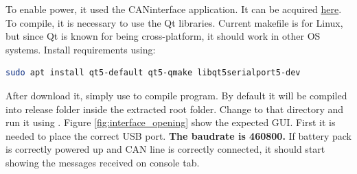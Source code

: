To enable power, it used the CANinterface application. It can be acquired \href{https://drive.google.com/drive/folders/14vwq4Xsy3RlByVp1BpFwrFQleFbBh3zu?usp=sharing}{here}. To compile, it is necessary to use the Qt libraries. Current makefile is for Linux, but since Qt is known for being cross-platform, it should work in other OS systems. Install requirements using: 

\begin{lstlisting}[frame=none,language=bash,backgroundcolor=\color{gray!15},numbers=none, basicstyle=\ttfamily]
sudo apt install qt5-default qt5-qmake libqt5serialport5-dev
\end{lstlisting}

After download it, simply use  to compile program. By default it will be compiled into release folder inside the extracted root folder. Change to that directory and run it using . Figure \ref{fig:interface_opening} show the expected GUI. First it is needed to place the correct USB port. \textbf{The baudrate is 460800.} If battery pack is correctly powered up and \gls{CAN} line is correctly connected, it should start showing the messages received on console tab. 

